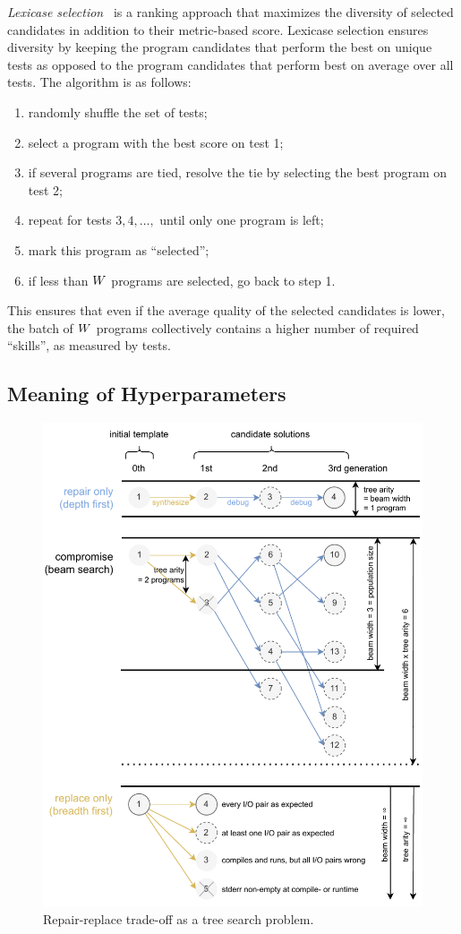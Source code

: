 \emph{Lexicase selection}~\cite{helmuth2015:solving} is a ranking approach that maximizes the diversity of selected candidates in addition to their metric-based score.
Lexicase selection ensures diversity by keeping the program candidates that perform the best on unique tests as opposed to the program candidates that perform best on average over all tests.
The algorithm is as follows:
\begin{enumerate}

\setlength{\parskip}{0pt}
\setlength\itemsep{0pt}

    \item randomly shuffle the set of tests;
    \item select a program with the best score on test 1;
    \item if several programs are tied, resolve the tie by selecting the best program on test 2;
    \item repeat for tests $3,4,\dots,$ until only one program is left;
    \item mark this program as ``selected'';
    \item if less than $W$ programs are selected, go back to step 1.
\end{enumerate}
This ensures that even if the average quality of the selected candidates is lower, the batch of $W{}$ programs collectively contains a higher number of required ``skills'', as measured by tests.



\subsection{Meaning of Hyperparameters}
\label{sec:seidr-beam-search}

\begin{figure}
    \centering
    \includegraphics[width=0.7\linewidth, trim={0mm 4mm 0mm 0mm}]{images/beamsearch.pdf}
    \caption{Repair-replace trade-off as a tree search problem.}
    \label{fig:beam-search}
\end{figure}

